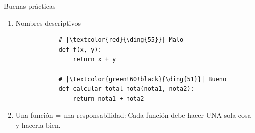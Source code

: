 \documentclass{beamer}
\begin{document}
            

            

    \begin{frame}[fragile,t]{Buenas prácticas}
        \begin{enumerate}
            \item Nombres descriptivos
            \begin{verbatim}
            # |\textcolor{red}{\ding{55}}| Malo
            def f(x, y):
                return x + y
            
            # |\textcolor{green!60!black}{\ding{51}}| Bueno
            def calcular_total_nota(nota1, nota2):
                return nota1 + nota2
            \end{verbatim}
            \item Una función = una responsabilidad: Cada función debe hacer UNA sola cosa y hacerla bien.
        \end{enumerate}
    \end{frame}
\end{document}
